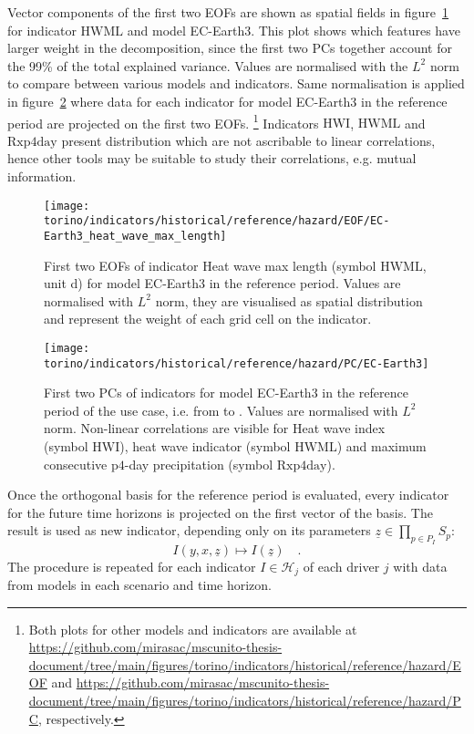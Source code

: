 Vector components of the first two \glspl{EOF} are shown as spatial fields in figure~\ref{fig:EOF_EC-Earth3_heat_wave_max_length} for indicator $\mathrm{HWML}$ and model EC-Earth3. This plot shows which features have larger weight in the decomposition, since the first two \glspl{PC} together account for the 99\% of the total explained variance. Values are normalised with the $L^2$ norm to compare between various models and indicators. Same normalisation is applied in figure~\ref{fig:PC_EC-Earth3} where data for each indicator for model EC-Earth3 in the reference period are projected on the first two \glspl{EOF}.%
\footnote{Both plots for other models and indicators are available at \url{https://github.com/mirasac/mscunito-thesis-document/tree/main/figures/torino/indicators/historical/reference/hazard/EOF} and \url{https://github.com/mirasac/mscunito-thesis-document/tree/main/figures/torino/indicators/historical/reference/hazard/PC}, respectively.}
Indicators $\mathrm{HWI}$, $\mathrm{HWML}$ and $\mathrm{Rxp4day}$ present distribution which are not ascribable to linear correlations, hence other tools may be suitable to study their correlations, e.g. mutual information.
\begin{figure}[h]
  \centering
  \texttt{[image: torino/indicators/historical/reference/hazard/EOF/EC-Earth3\_heat\_wave\_max\_length]}
  \caption{First two \glspl{EOF} of indicator {Heat wave max length} (symbol $\mathrm{HWML}$, unit \unit{\day}) for model EC-Earth3 in the reference period. Values are normalised with $L^2$ norm, they are visualised as spatial distribution and represent the weight of each grid cell on the indicator.}
  \label{fig:EOF_EC-Earth3_heat_wave_max_length}
\end{figure}
\begin{figure}[h]
  \centering
  \texttt{[image: torino/indicators/historical/reference/hazard/PC/EC-Earth3]}
  \caption{First two \glspl{PC} of indicators for model EC-Earth3 in the reference period of the use case, i.e. from  to . Values are normalised with $L^2$ norm. Non-linear correlations are visible for {Heat wave index} (symbol $\mathrm{HWI}$), heat wave indicator (symbol $\mathrm{HWML}$) and maximum consecutive $\mathrm{p4}$-day precipitation (symbol $\mathrm{Rxp4day}$).}
  \label{fig:PC_EC-Earth3}
\end{figure}

Once the orthogonal basis for the reference period is evaluated, every indicator for the future time horizons is projected on the first vector of the basis. The result is used as new indicator, depending only on its parameters $\underline{z} \in \prod_{p \in P_I} S_p$:
\begin{equation}
  \label{eq:spatial_aggregation}
  I(y, x, \underline{z}) \mapsto I(\underline{z})%
  \quad .
\end{equation}
The procedure is repeated for each indicator $I \in \mathcal{H}_j$ of each \gls{driver} $j$ with data from models in each scenario and time horizon.


